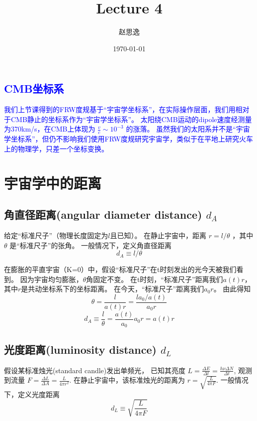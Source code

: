 \documentclass[12pt]{ctexart}
\title{Lecture 4}
\author{赵思逸}
\date{\today}
\newcommand{\new}[1]{\textcolor{blue}{#1}}
\begin{document}
\maketitle

\new{\section*{CMB坐标系}}


\new{
我们上节课得到的FRW度规基于“宇宙学坐标系”，在实际操作层面，我们用相对于CMB静止的坐标系作为“宇宙学坐标系”。  
太阳绕CMB运动的dipole速度经测量为370km/s，在CMB上体现为 $\frac{v}{c} \sim 10^{-3}$ 的涨落。
虽然我们的太阳系并不是“宇宙学坐标系”，但仍不影响我们使用FRW度规研究宇宙学，类似于在平地上研究火车上的物理学，只差一个坐标变换。
}

\section{宇宙学中的距离}

\subsection{角直径距离(angular diameter distance) $d_A$ }

给定“标准尺子”（物理长度固定为$l$且已知）。
在静止宇宙中，距离 $r = l/\theta$ ，其中 $\theta$ 是“标准尺子”的张角。
一般情况下，定义角直径距离
\begin{equation}
    d_A \equiv l/\theta
\end{equation}

在膨胀的平直宇宙（K=0）中，假设“标准尺子”在t时刻发出的光今天被我们看到。
因为宇宙均匀膨胀，$\theta$角固定不变。
在t时刻，“标准尺子”距离我们$a(t)r$，其中$r$是共动坐标系下的坐标距离。
在今天，“标准尺子”距离我们$a_0 r$。
由此得知
\begin{equation}
    \theta = \frac{l}{a(t)r} = \frac{l a_0/a(t)}{a_0 r}
\end{equation}
\begin{equation}
    d_A \equiv \frac{l}{\theta} = \frac{a(t)}{a_0} a_0 r = a(t) r
\end{equation}

\subsection{光度距离(luminosity distance) $d_L$ }

假设某标准烛光(standard candle)发出单频光，
已知其亮度 $L=\frac{\Delta E}{\Delta t} = \frac{h\nu \Delta N}{\Delta t}$,
观测到流量 $F=\frac{\Delta L}{\Delta A} = \frac{L}{4\pi r^2}$.
在静止宇宙中，该标准烛光的距离为 $r=\sqrt{\frac{L}{4\pi F}}$.
一般情况下，定义光度距离
\begin{equation}
    d_L \equiv \sqrt{\frac{L}{4\pi F}}
\end{equation}
\end{document}
